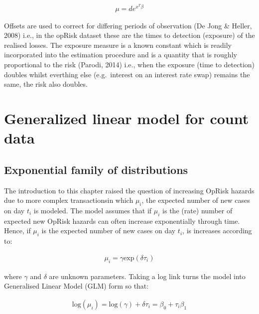 \documentclass{DissertateUSU}
\begin{document}
\singlespacing

\begin{eqnarray}
\mu = d e^{x^T\beta}
\end{eqnarray} \doublespacing

Offsets are used to correct for differing periods of observation (De
Jong \& Heller, 2008) i.e., in the opRisk dataset these are the times to
detection (exposure) of the realised losses. The exposure measure is a
known constant which is readily incorporated into the estimation
procedure and is a quantity that is roughly proportional to the risk
(Parodi, 2014) i.e., when the exposure (time to detection) doubles
whilst everthing else (e.g.~interest on an interest rate swap) remains
the same, the risk also doubles.

\section{Generalized linear model for count data}
\label{sec:Generalized linear model for count data}

\subsection{Exponential family of distributions}

The introduction to this chapter raised the question of increasing
OpRisk hazards due to more complex transactionsin which \(\mu_i\), the
expected number of new cases on day \(t_i\) is modeled. The model
assumes that if \(\mu_i\) is the (rate) number of expected new OpRisk
hazards can often increase exponentially through time. Hence, if
\(\mu_i\) is the expected number of new cases on day \(t_i\), is
increases according to:

\singlespacing

\begin{eqnarray}\label{expgrowth}
\mu_i = \gamma \mbox{exp}({\delta\tau_i}) \nonumber
\end{eqnarray} \doublespacing

where \(\gamma\) and \(\delta\) are unknown parameters. Taking a log
link turns the model into Generalised Linear Model (GLM) form so that:

\singlespacing

\begin{eqnarray}\label{eqn:simplepoisson}
\mbox{log}(\mu_i) = \mbox{log}(\gamma) + \delta\tau_i = \beta_0 + \tau_i\beta_1
\end{eqnarray} \doublespacing
\end{document}
